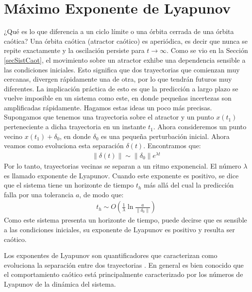 \section{Máximo Exponente de Lyapunov}
\label{secMLE}

¿Qué es lo que diferencia a un ciclo límite o una órbita cerrada de una órbita caótica?
Una órbita caótica (atractor caótico) es aperiódica, es decir que nunca se repite exactamente y la oscilación persiste para $t \to \infty$.
Como se vio en la Sección \ref{secSistCaot}, el movimiento sobre un atractor exhibe una dependencia sensible a las condiciones iniciales.
Esto significa que dos trayectorias que comienzan muy cercanas, divergen rápidamente una de otra, por lo que tendrán futuros muy diferentes.
La implicación práctica de esto es que la predicción a largo plazo se vuelve imposible en un sistema como este, en donde pequeñas incertezas son amplificadas rápidamente.
Hagamos estas ideas un poco más precisas.
Supongamos que tenemos una trayectoria sobre el atractor y un punto $x(t_1)$ perteneciente a dicha trayectoria en un instante $t_1$.
Ahora consideremos un punto vecino $x(t_1) + \delta_0$, en donde $\delta_0$ es una pequeña perturbación inicial.
Ahora veamos como evoluciona esta separación $\delta(t)$.
Encontramos que:
%
\begin{eqnarray}
\lVert \delta(t) \rVert \sim \lVert \delta_0 \rVert e^{\lambda t}
\end{eqnarray}
%
Por lo tanto, trayectorias vecinas se separan a un ritmo exponencial.
El número $\lambda$ es llamado exponente de Lyapunov.
Cuando este exponente es positivo, se dice que el sistema tiene un horizonte de tiempo $t_h$ más allá del cual la predicción falla por una tolerancia $a$, de modo que:
%
\begin{eqnarray}
t_h \sim O ( \frac{1}{\lambda} \ln \frac{a}{\lVert \delta_0 \rVert})
\end{eqnarray}
%
Como este sistema presenta un horizonte de tiempo, puede decirse que es sensible a las condiciones iniciales, su exponente de Lyapunov es positivo y resulta ser caótico.

Los exponentes de Lyapunov son quantificadores que caracterizan como evoluciona la separación entre dos trayectorias \cite{Sprott2003}.
En general es bien conocido que el comportamiento caótico está principalmente caracterizado por los números de Lyapunov de la dinámica del sistema.

